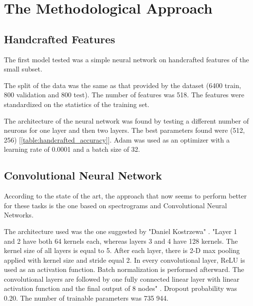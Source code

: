 \section{The Methodological Approach}


\subsection{Handcrafted Features}
The first model tested was a simple neural network on handcrafted features of the small subset.

The split of the data was the same as that provided by the dataset (6400 train, 800 validation and 800 test).
The number of features was 518. The features were standardized on the statistics of the training set.

The architecture of the neural network was found by testing a different number of neurons for one layer and then two layers.
The best parameters found were (512, 256) [\ref{table:handcrafted_accuracy}].
Adam was used as an optimizer with a learning rate of 0.0001 and a batch size of 32.

\subsection{Convolutional Neural Network}
According to the state of the art\cite{zeng2019spectrogram}, the approach that now seems to perform better for these tasks is the one based on spectrograms and Convolutional Neural Networks.

The architecture used was the one suggested by "Daniel Kostrzewa" \cite{kostrzewa2021music}.
"Layer 1 and 2 have both 64 kernels each, whereas layers 3 and 4 have 128 kernels. The kernel size of all layers is equal to 5. After each layer, there is 2-D max pooling applied with kernel size and stride equal 2. In every convolutional layer, ReLU is used as an activation function. Batch normalization is performed afterward. The convolutional layers are followed by one fully connected linear layer with linear activation function and the final output of 8 nodes" \cite{kostrzewa2021music}. Dropout probability was 0.20. The number of trainable parameters was 735 944.


